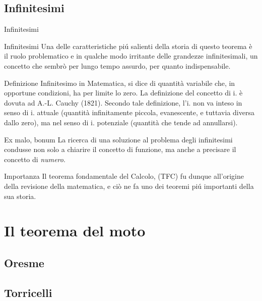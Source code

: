 \documentclass[8pt]{beamer}
\begin{document}
\subsection{Infinitesimi}
\begin{frame}{Infinitesimi}
  \begin{alertblock}{Infinitesimi}
    Una delle caratteristiche piú salienti della storia di questo teorema è il ruolo problematico
    e in qualche modo irritante delle grandezze infinitesimali, un concetto che sembrò per lungo tempo
    assurdo, per quanto indispensabile.
  \end{alertblock}
  \pause
  \begin{block}{Definizione}
    \alert{Infinitesimo} in Matematica, si dice di quantità variabile che,
    in opportune condizioni, ha per limite lo zero.
    La definizione del concetto di i. è dovuta ad A.-L. Cauchy (1821).
    Secondo tale definizione,
    l’i. non va inteso in senso di i. attuale (quantità infinitamente piccola,
    evanescente, e tuttavia diversa dallo zero),
    ma nel senso di i. potenziale (quantità che tende ad annullarsi).
  \end{block}

  \pause
  \begin{block}{Ex malo, bonum}
    La ricerca di una soluzione al problema degli infinitesimi condusse non solo a chiarire il concetto
    di funzione, ma anche a precisare il concetto di \textit{numero}.
  \end{block}

  \pause
  \begin{block}{Importanza}
    Il teorema fondamentale del Calcolo, \alert{(TFC)} fu dunque all'origine
    della revisione della matematica, e ciò ne fa uno dei teoremi piú importanti
    della sua storia.
  \end{block}

\end{frame}

\section{Il teorema del moto}
\subsection{Oresme}

\subsection{Torricelli}

\end{document}
